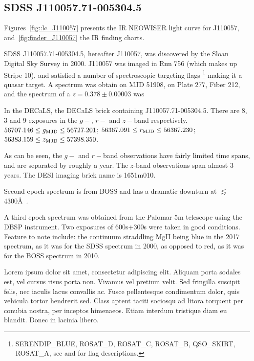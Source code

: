 \documentclass{emulateapj}
\begin{document}
\subsection{SDSS J110057.71-005304.5}
Figures~\ref{fig::lc_J110057} presents the IR NEOWISER light curve for 
J110057, and~\ref{fig:finder_J110057} the IR finding charts. 

SDSS J110057.71-005304.5, hereafter J110057, was discovered by 
the Sloan Digital Sky Survey in 2000. 
 J110057 was imaged in Run 756 (which makes up Stripe 10), 
and satisfied a number of spectroscopic targeting flags
\footnote{SERENDIP\_BLUE, ROSAT\_D,  ROSAT\_C,  ROSAT\_B, QSO\_SKIRT, ROSAT\_A, 
see \citet{EDR} and \citet{Richards02} for flag descriptions.}
making it a quasar target. A spectrum was obtain on MJD 51908, on Plate 
277, Fiber 212, and the spectrum of a $z=0.378\pm0.00003$ was

In the DECaLS, the DECaLS brick containing J110057.71-005304.5.
There are 8, 3 and 9 exposures in the $g-$, $r-$ and $z-$band 
respectively. 
$56707.146 \leq g_{\rm MJD} \leq  56727.201$;  
$56367.091 \leq  r_{\rm MJD} \leq  56367.230$; 
$56383.159 \leq  z_{\rm MJD} \leq  57398.350$. 

As can be seen, the $g-$ and $r-$band observations have fairly limited
time spans, and are separated by roughly a year. The $z$-band
observations span almost 3 years.  The DESI imaging brick name is
1651m010.

Second epoch spectrum is from BOSS and has a dramatic downturn at 
$\lesssim$4300\AA\ . 

A third epoch spectrum was obtained from the Palomar 5m 
telescope using the DBSP instrument. 
Two exposures of 600s+300s were taken in good conditions. 
Feature to note include: the continuum straddling MgII
being blue in the 2017 spectrum, as it was for the SDSS spectrum in 2000, as opposed to
red, as it was for the BOSS spectrum in 2010.  

Lorem ipsum dolor sit amet, consectetur adipiscing elit. Aliquam porta
sodales est, vel cursus risus porta non. Vivamus vel pretium
velit. Sed fringilla suscipit felis, nec iaculis lacus convallis
ac. Fusce pellentesque condimentum dolor, quis vehicula tortor
hendrerit sed. Class aptent taciti sociosqu ad litora torquent per
conubia nostra, per inceptos himenaeos. Etiam interdum tristique diam
eu blandit. Donec in lacinia libero.
\end{document}

